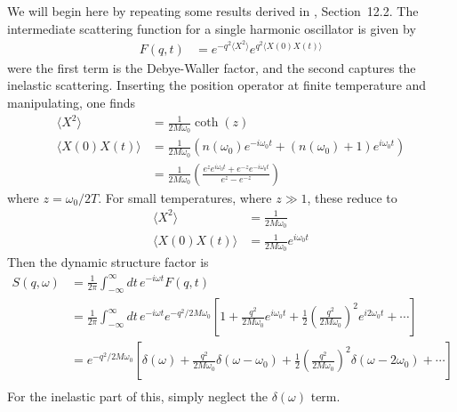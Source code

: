 \documentclass{article}
\begin{document}
We will begin here by repeating some results derived in \cite{interactions}, Section~12.2. The intermediate scattering function for a single harmonic oscillator is given by
\begin{align}
F(q, t) &= e^{-q^2 \langle X^2 \rangle} e^{q^2 \langle X(0)X(t) \rangle}
\end{align}
were the first term is the Debye-Waller factor, and the second captures the inelastic scattering. Inserting the position operator at finite temperature and manipulating, one finds
\begin{align}
\langle X^2 \rangle &= \frac{1}{2 M \omega_0} \coth(z) \\
\langle X(0)X(t) \rangle &= \frac{1}{2 M \omega_0} \left( n(\omega_0)e^{-i \omega_0 t} + (n(\omega_0) + 1)e^{i \omega_0 t} \right) \nonumber\\
  &= \frac{1}{2 M \omega_0} \left( \frac{e^z e^{i \omega_0 t} + e^{-z} e^{-i \omega_0 t}}{e^z - e^{-z}} \right)
\end{align}
where $z = \omega_0 / 2 T$. For small temperatures, where $z\gg 1$, these reduce to
\begin{align}
\langle X^2 \rangle &= \frac{1}{2 M \omega_0} \\
\langle X(0)X(t) \rangle &= \frac{1}{2 M \omega_0} e^{i \omega_0 t}
\end{align}
Then the dynamic structure factor is
\begin{align}
S(q, \omega) &= \frac{1}{2 \pi} \int_{-\infty}^\infty dt \, e^{-i \omega t} F(q, t) \nonumber\\
   &= \frac{1}{2 \pi} \int_{-\infty}^\infty dt \, e^{-i \omega t} e^{-q^2 / 2 M \omega_0} \left[ 1 + \frac{q^2}{2 M \omega_0}e^{i \omega_0t} + \frac12 \left( \frac{q^2}{2 M \omega_0} \right)^2 e^{i2 \omega_0 t} + \cdots \right] \nonumber\\
   &= e^{-q^2 / 2 M \omega_0} \left[ \delta(\omega) + \frac{q^2}{2 M \omega_0}\delta(\omega - \omega_0) + \frac12 \left( \frac{q^2}{2 M \omega_0} \right)^2 \delta(\omega - 2\omega_0) + \cdots \right] \nonumber\\
\end{align}
For the inelastic part of this, simply neglect the $\delta(\omega)$ term.
\end{document}
